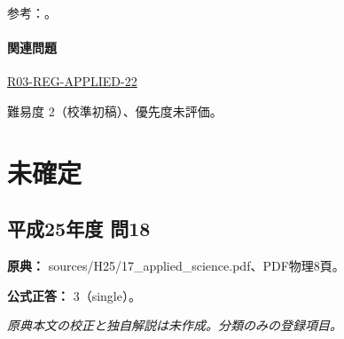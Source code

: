 \par 参考：\cite{hom_quartz,hom_biotite,hom_forsterite,hom_augite}。

\paragraph{関連問題} \hyperref[q:r03-reg-applied-22]{R03-REG-APPLIED-22}

\par 難易度 2（校準初稿）、優先度未評価。

\section{未確定}

\subsection{平成25年度 問18}
\label{q:h25-reg-applied-18}

\noindent\textbf{原典：} sources/H25/17\_applied\_science.pdf、PDF物理8頁。

\textbf{公式正答：} 3（single）。

\par\textit{原典本文の校正と独自解説は未作成。分類のみの登録項目。}
